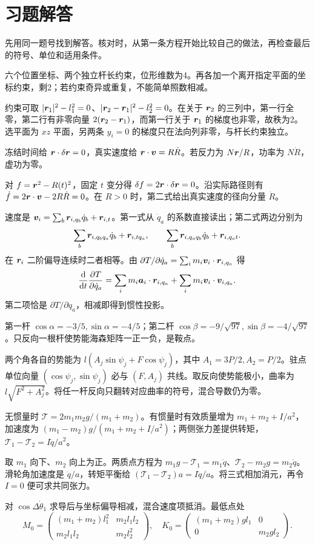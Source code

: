 \section*{习题解答}
先用同一题号找到解答。核对时，从第一条方程开始比较自己的做法，再检查最后的符号、单位和适用条件。
\begin{bookexercises}
\item 六个位置坐标、两个独立杆长约束，位形维数为4。再各加一个离开指定平面的坐标约束，剩2；若约束奇异或重复，不能简单照数相减。

约束可取 $|\boldsymbol{r}_1|^2-l_1^2=0$、$|\boldsymbol{r}_2-\boldsymbol{r}_1|^2-l_2^2=0$。在关于 $\boldsymbol{r}_2$ 的三列中，第一行全零，第二行有非零向量 $2(\boldsymbol{r}_2-\boldsymbol{r}_1)$，而第一行关于 $\boldsymbol{r}_1$ 的梯度也非零，故秩为2。选平面为 $xz$ 平面，另两条 $y_i=0$ 的梯度只在法向列非零，与杆长约束独立。
\item 冻结时间给 $\boldsymbol{r}\cdot\delta\boldsymbol{r}=0$，真实速度给 $\boldsymbol{r}\cdot\boldsymbol{v}=R\dot R$。若反力为 $N\boldsymbol{r}/R$，功率为 $N\dot R$，虚功为零。

对 $f=\boldsymbol{r}^2-R(t)^2$，固定 $t$ 变分得 $\delta f=2\boldsymbol{r}\cdot\delta\boldsymbol{r}=0$。沿实际路径则有 $\dot f=2\boldsymbol{r}\cdot\boldsymbol{v}-2R\dot R=0$。在 $R>0$ 时，第二式给出真实速度的径向分量 $\dot R$。
\item 速度是 $\boldsymbol{v}_i=\sum_b\boldsymbol{r}_{i,q_b}\dot q_b+\boldsymbol{r}_{i,t}$。第一式从 $\dot q_a$ 的系数直接读出；第二式两边分别为
\[
\sum_b\boldsymbol{r}_{i,q_bq_a}\dot q_b+\boldsymbol{r}_{i,tq_a},\qquad
\sum_b\boldsymbol{r}_{i,q_aq_b}\dot q_b+\boldsymbol{r}_{i,q_at}.
\]
在 $\boldsymbol{r}_i$ 二阶偏导连续时二者相等。由 $\partial T/\partial\dot q_a=\sum_i m_i\boldsymbol{v}_i\cdot\boldsymbol{r}_{i,q_a}$ 得
\[
\frac{\mathrm{d}}{\mathrm{d} t}\frac{\partial T}{\partial\dot q_a}
=\sum_i m_i\boldsymbol{a}_i\cdot\boldsymbol{r}_{i,q_a}
 +\sum_i m_i\boldsymbol{v}_i\cdot\boldsymbol{v}_{i,q_a}.
\]
第二项恰是 $\partial T/\partial q_a$，相减即得到惯性投影。
\item 第一杆 $\cos\alpha=-3/5,\sin\alpha=-4/5$；第二杆 $\cos\beta=-9/\sqrt{97},\sin\beta=-4/\sqrt{97}$。只反向一根杆使势能海森矩阵一正一负，是鞍点。

两个角各自的势能为 $l(A_j\sin\psi_j+F\cos\psi_j)$，其中 $A_1=3P/2,A_2=P/2$。驻点单位向量 $(\cos\psi_j,\sin\psi_j)$ 必与 $(F,A_j)$ 共线。取反向使势能极小，曲率为 $l\sqrt{F^2+A_j^2}$。将任一杆反向只翻转对应曲率的符号，混合导数仍为零。
\item 无惯量时 $\mathcal T=2m_1m_2g/(m_1+m_2)$。有惯量时有效质量增为 $m_1+m_2+I/a^2$，加速度为 $(m_1-m_2)g/(m_1+m_2+I/a^2)$；两侧张力差提供转矩，$\mathcal T_1-\mathcal T_2=I\ddot q/a^2$。

取 $m_1$ 向下、$m_2$ 向上为正。两质点方程为 $m_1g-\mathcal T_1=m_1\ddot q$、$\mathcal T_2-m_2g=m_2\ddot q$。滑轮角加速度是 $\ddot q/a$，转矩平衡给 $(\mathcal T_1-\mathcal T_2)a=I\ddot q/a$。将三式相加消元，再令 $I=0$ 便可求共同张力。
\item 对 $\cos\Delta\dot\theta_1$ 求导后与坐标偏导相减，混合速度项抵消。最低点处
\[
M_0=\begin{pmatrix}(m_1+m_2)l_1^2&m_2l_1l_2\\m_2l_1l_2&m_2l_2^2\end{pmatrix},\quad
K_0=\begin{pmatrix}(m_1+m_2)gl_1&0\\0&m_2gl_2\end{pmatrix}.
\]


\end{bookexercises}
